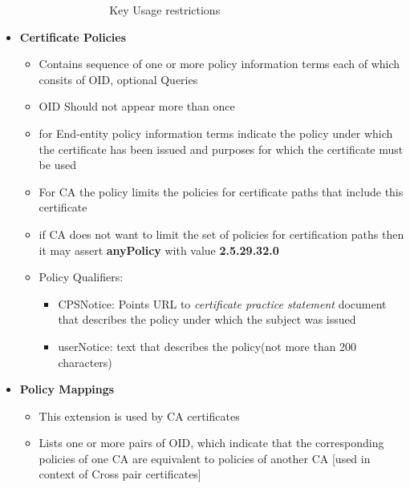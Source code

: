 \documentclass[a4paper]{article}
\begin{document}
\begin{itemize}
\begin{itemize}
\begin{itemize}
\begin{itemize}
\begin{figure}[ht!]
                                    \caption{Key Usage restrictions}
                                \end{figure}
                            \end{itemize}
                    \end{itemize}
                \end{itemize}
            \item \textbf{Certificate Policies}
                \begin{itemize}
                    \item Contains sequence of one or more policy information terms each of which consits of
                        OID, optional Queries
                    \item OID Should not appear more than once
                    \item for End-entity policy information terms indicate the policy under which the certificate
                        has been issued and purposes for which the certificate must be used
                    \item For CA the policy limits the policies for certificate paths that include this certificate
                    \item if CA does not want to limit the set of policies for certification paths then it may assert
                        \textbf{anyPolicy} with value \textbf{2.5.29.32.0}
                    \item Policy Qualifiers:
                        \begin{itemize}
                            \item CPSNotice: Points URL to \textit{certificate practice statement} document that describes
                                the policy under which the subject was issued
                            \item userNotice: text that describes the policy(not more than 200 characters)
                        \end{itemize}
                \end{itemize}
            \item \textbf{Policy Mappings}
                \begin{itemize}
                    \item This extension is used by CA certificates 
                    \item Lists one or more pairs of OID, which indicate that the corresponding policies 
                        of one CA are equivalent to policies of another CA [used in context of Cross pair certificates]

\end{itemize}
\end{itemize}
\end{document}

